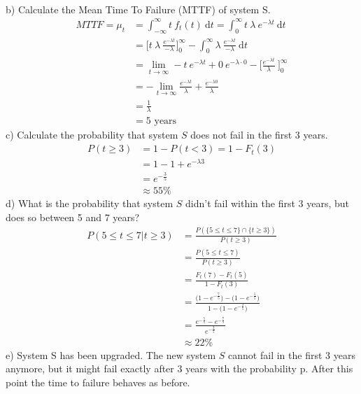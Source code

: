\documentclass[a4paper,footsepline]{scrartcl}
\begin{document}
	\vspace{0.4cm}\\
	b) Calculate the Mean Time To Failure (MTTF) of system S.\\
	\begin{align*}
		MTTF = \mu_t &= \int_{-\infty}^{\infty} t\ f_t(t)\ \text{d} t
		= \int_{0}^{\infty} t\ \lambda\ e^{-\lambda t}\ \text{d} t\\
		&= \Big[ t\ \lambda\  \frac{e^{-\lambda t}}{- \lambda}  \Big]_0^\infty - \int_{0}^{\infty} \lambda\ \frac{e^{-\lambda t}}{- \lambda}\ \text{d} t\\
		&=  \lim\limits_{t \rightarrow \infty} - t\  e^{-\lambda t} + 0\ e^{- \lambda \cdot 0} - \big[ \frac{e^{-\lambda t}}{\lambda}\ \Big]_0^\infty \\
		&= - \lim\limits_{t \rightarrow \infty} \frac{e^{-\lambda t}}{\lambda}  + \frac{e^{-\lambda 0}}{\lambda}\\
		&= \frac{1}{\lambda}\\
		&= 5 \text{ years}
	\end{align*}
	c) Calculate the probability that system $S$ does not fail in the first 3 years.\\
	\begin{align*}
	 P(t \geq 3) & = 1 - P(t < 3) = 1 - F_t(3) \\
	 &= 1 - 1  + e^{-\lambda 3}\\
	 &= e^{-\frac{3}{5}} \\
	 & \approx 55\%
	\end{align*}
	d) What is the probability that system $S$ didn’t fail within the first 3 years, but does so
	between 5 and 7 years?
	\begin{align*}
		P(5 \leq t \leq 7 | t \geq 3) &= \frac{P(\{5 \leq t \leq 7\} \cap \{t \geq 3\} ) }{P(t \geq 3)}\\
		&= \frac{P(5 \leq t \leq 7)}{P(t \geq 3)}\\
		&= \frac{F_t(7) - F_t(5)}{1-F_t(3)}\\
		&= \frac{\big(1-e^{-\frac{7}{5}}\big) - \big(1-e^{-\frac{5}{5}}\big)}{1-\big(1-e^{-\frac{3}{5}}\big)}\\
		&= \frac{e^{-\frac{5}{5}}-e^{-\frac{7}{5}}}{e^{-\frac{3}{5}}}\\
		&\approx 22\%
	\end{align*}
	e) System S has been upgraded. The new system $S$ cannot fail in the first 3 years anymore,
	but it might fail exactly after 3 years with the probability p. After this point the time
	to failure behaves as before.\\
\end{document}
